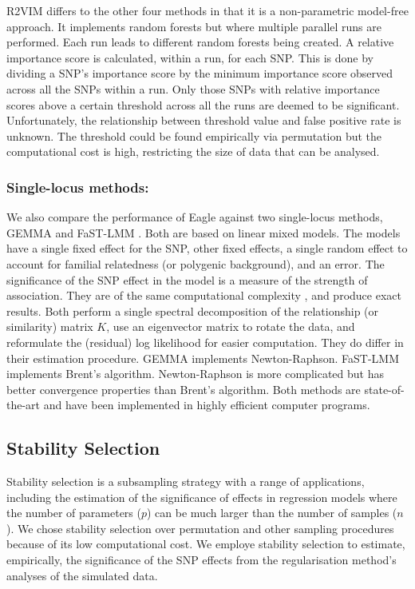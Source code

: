 \documentclass{article}
\begin{document}
  
R2VIM differs to the other four methods in that it is a non-parametric model-free approach. It implements  
random forests but where multiple parallel runs are performed. Each run leads to 
different random forests being created.  A relative importance score is calculated, within a run,  for each SNP. This is done by dividing a SNP's 
importance score by the minimum importance score observed across all the SNPs within a run. 
Only those SNPs with relative importance scores above a certain threshold across all the runs are deemed to be significant. 
Unfortunately, the relationship between threshold value and false positive rate is unknown. The threshold could be found empirically via permutation 
but the computational cost is high, restricting the size of data that can be analysed. 



\subsubsection{Single-locus methods:} We also compare the performance of Eagle against two single-locus methods, GEMMA \citep{zhou2012genome} and FaST-LMM \citep{lippert2011fast}. Both are based on linear mixed models. The models have a single fixed effect for the SNP,  other fixed effects, 
a single random effect to account for familial relatedness (or polygenic background), and an error. The significance of the SNP effect in the model 
is a measure of the strength of association.  They are of the same computational complexity \citep{zhou2012genome}, and produce exact results.  
Both perform a single spectral decomposition of the relationship (or similarity) matrix $K$, use  an eigenvector matrix to rotate the data, 
and reformulate the (residual) log likelihood for easier computation. They do differ in their estimation procedure. GEMMA implements Newton-Raphson. 
FaST-LMM implements Brent's algorithm. Newton-Raphson is more complicated but has better convergence properties than Brent's algorithm. 
Both methods are state-of-the-art and have been implemented in highly efficient computer programs. 



\subsection{Stability Selection}

 Stability selection \citep{meinshausen2010stability}  is a subsampling strategy with a range of applications, including the estimation of the significance of effects in regression models where 
the number of parameters ($p$) can be much larger than the number of samples ($n$). We chose stability selection over permutation and other sampling procedures because of its low computational cost. We employe stability selection to estimate, empirically, the significance of the SNP effects from the regularisation method's analyses of the simulated data.
\end{document}
